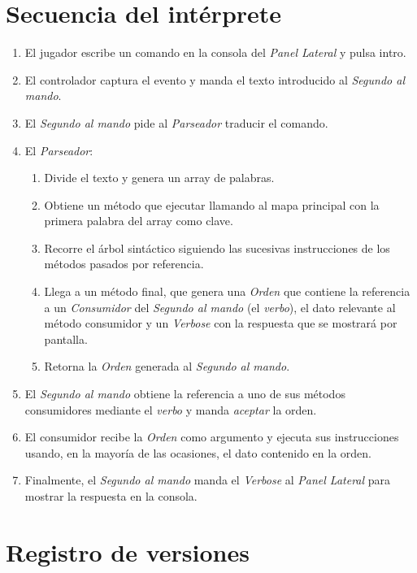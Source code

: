 \documentclass[a4paper,
	11pt,
	parskip=full,
	bibliography=totoc,
	twoside
	]{scrartcl}
\let\oldsection\section
\def\section{\cleardoubleoddpage\oldsection}
\begin{document}
\section{Secuencia del intérprete}
\label{app:interpreter}
	\begin{enumerate}[noitemsep]
		\item El jugador escribe un comando en la consola del \textit{Panel Lateral} y pulsa intro.
		\item El controlador captura el evento y manda el texto introducido al \textit{Segundo al mando}.
		\item El \textit{Segundo al mando} pide al \textit{Parseador} traducir el comando.
		\item El \textit{Parseador}:
		\begin{enumerate}[noitemsep]
			\item Divide el texto y genera un array de palabras.
			\item Obtiene un método que ejecutar llamando al mapa principal con la primera palabra del array como clave.
			\item Recorre el árbol sintáctico siguiendo las sucesivas instrucciones de los métodos pasados por referencia.
			\item Llega a un método final, que genera una \textit{Orden} que contiene la referencia a un \textit{Consumidor} del \textit{Segundo al mando} (el \textit{verbo}), el dato relevante al método consumidor y un \textit{Verbose} con la respuesta que se mostrará por pantalla.
			\item Retorna la \textit{Orden} generada al \textit{Segundo al mando}.
		\end{enumerate}
		\item El \textit{Segundo al mando} obtiene la referencia a uno de sus métodos consumidores mediante el \textit{verbo} y manda \textit{aceptar} la orden.
		\item El consumidor recibe la \textit{Orden} como argumento y ejecuta sus instrucciones usando, en la mayoría de las ocasiones, el dato contenido en la orden.
		\item Finalmente, el \textit{Segundo al mando} manda el \textit{Verbose} al \textit{Panel Lateral} para mostrar la respuesta en la consola.
	\end{enumerate}

\section{Registro de versiones}
\label{app:changelog}
\singlespacing
	\begin{multicols}{2}
		
	\end{multicols}
\end{document}
